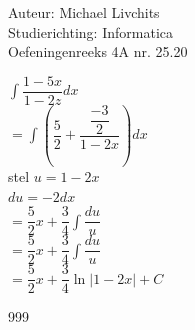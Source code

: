 \documentclass[a4paper]{article}
\begin{document}
  
\noindent \large Auteur: Michael Livchits \\
\noindent \large Studierichting: Informatica\\
\noindent \large Oefeningenreeks 4A nr. 25.20\\

\medskip

\normalsize

$\displaystyle\int\dfrac{1-5x}{1-2z}dx$\\

$= \displaystyle\int\left(\dfrac{5}{2}+\dfrac{\dfrac{-3}{2}}{1-2x}\right)dx$\\

stel $u = 1-2x$\\

$du = -2dx$\\

$= \dfrac{5}{2}x+\dfrac{3}{4}\displaystyle\int\dfrac{du}{u}$\\

$= \dfrac{5}{2}x+\dfrac{3}{4}\displaystyle\int\dfrac{du}{u}$\\

$= \dfrac{5}{2}x+\dfrac{3}{4}\ln|1-2x|+C$\\

\begin{thebibliography}{999}
\end{thebibliography}
\end{document}
